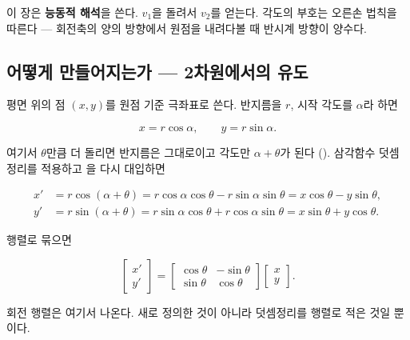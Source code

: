 이 장은 \textbf{능동적 해석}을 쓴다. $v_1$을 돌려서 $v_2$를 얻는다. 각도의 부호는
오른손 법칙을 따른다 --- 회전축의 양의 방향에서 원점을 내려다볼 때 반시계 방향이
양수다.

\subsection{어떻게 만들어지는가 --- 2차원에서의 유도}
\label{sec:hw2-bg-2d}

평면 위의 점 $(x, y)$를 원점 기준 극좌표로 쓴다. 반지름을 $r$, 시작 각도를 $\alpha$라
하면

\begin{equation}
\label{eq:hw2-bg-polar}
x = r\cos\alpha, \qquad y = r\sin\alpha .
\end{equation}

여기서 $\theta$만큼 더 돌리면 반지름은 그대로이고 각도만 $\alpha + \theta$가 된다
(). 삼각함수 덧셈정리를 적용하고
을 다시 대입하면

\begin{align}
x' &= r\cos(\alpha + \theta)
    = r\cos\alpha\cos\theta - r\sin\alpha\sin\theta
    = x\cos\theta - y\sin\theta, \label{eq:hw2-bg-xp} \\
y' &= r\sin(\alpha + \theta)
    = r\sin\alpha\cos\theta + r\cos\alpha\sin\theta
    = x\sin\theta + y\cos\theta. \label{eq:hw2-bg-yp}
\end{align}

행렬로 묶으면

\begin{equation}
\label{eq:hw2-bg-2d}
\begin{bmatrix} x' \\ y' \end{bmatrix}
=
\begin{bmatrix}
\cos\theta & -\sin\theta \\
\sin\theta & \cos\theta
\end{bmatrix}
\begin{bmatrix} x \\ y \end{bmatrix}.
\end{equation}

회전 행렬은 여기서 나온다. 새로 정의한 것이 아니라 덧셈정리를 행렬로 적은 것일
뿐이다.

